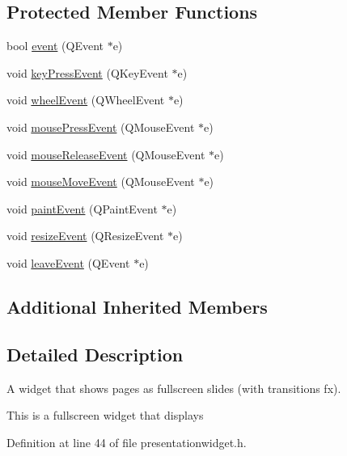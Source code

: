 \subsection*{Protected Member Functions}
\begin{DoxyCompactItemize}
\item 
bool \hyperlink{classPresentationWidget_ac4052134a73c3a957fbac11837c81714}{event} (Q\+Event $\ast$e)
\item 
void \hyperlink{classPresentationWidget_a2fce466227974c5258fc5123dd875114}{key\+Press\+Event} (Q\+Key\+Event $\ast$e)
\item 
void \hyperlink{classPresentationWidget_a70da82bbab9dbf243bb8e4637537f20e}{wheel\+Event} (Q\+Wheel\+Event $\ast$e)
\item 
void \hyperlink{classPresentationWidget_a502d9c8e44488ae4c78fef4ab4e6da4c}{mouse\+Press\+Event} (Q\+Mouse\+Event $\ast$e)
\item 
void \hyperlink{classPresentationWidget_a7f761d8aec6ec9c55fdf466c5c21bb6b}{mouse\+Release\+Event} (Q\+Mouse\+Event $\ast$e)
\item 
void \hyperlink{classPresentationWidget_a7f059f2489e5482ce1e69759d50b5200}{mouse\+Move\+Event} (Q\+Mouse\+Event $\ast$e)
\item 
void \hyperlink{classPresentationWidget_a95dc92b582c27c1cd979878f1805f179}{paint\+Event} (Q\+Paint\+Event $\ast$e)
\item 
void \hyperlink{classPresentationWidget_a710b035d00f0b81e835a31d01782c6ff}{resize\+Event} (Q\+Resize\+Event $\ast$e)
\item 
void \hyperlink{classPresentationWidget_a6298d50d07e540d555f6b8da8c8054ba}{leave\+Event} (Q\+Event $\ast$e)
\end{DoxyCompactItemize}
\subsection*{Additional Inherited Members}


\subsection{Detailed Description}
A widget that shows pages as fullscreen slides (with transitions fx). 

This is a fullscreen widget that displays 

Definition at line 44 of file presentationwidget.\+h.



